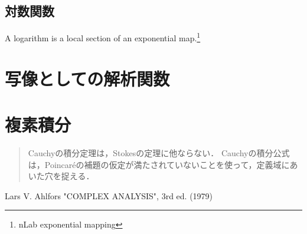 \documentclass[uplatex, dvipdfmx]{jsreport}
\begin{document}
\section{対数関数}

\begin{screen}
    A logarithm is a local section of an exponential map.\footnote{nLab exponential mapping}
\end{screen}

\chapter{写像としての解析関数}

\chapter{複素積分}

\begin{quotation}
    Cauchyの積分定理は，Stokesの定理に他ならない．
    Cauchyの積分公式は，Poincaréの補題の仮定が満たされていないことを使って，定義域にあいた穴を捉える．
\end{quotation}

\begin{thebibliography}{99}
    Lars V. Ahlfors "COMPLEX ANALYSIS", 3rd ed. (1979)
\end{thebibliography}
\end{document}
